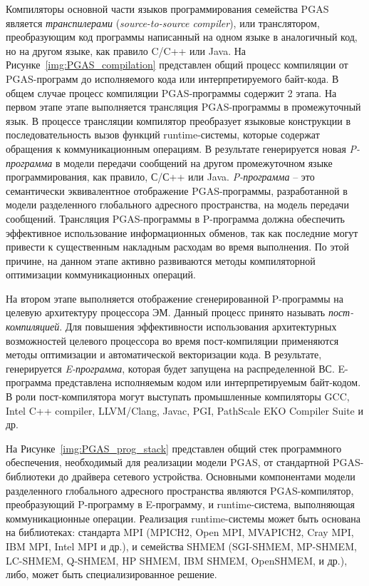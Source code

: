Компиляторы основной части языков программирования семейства PGAS является \textit{транспилерами} (\textit{source-to-source compiler}), или транслятором, преобразующим код программы написанный на одном языке в аналогичный код, но на другом языке, как правило C/C++ или Java. На Рисунке~\ref{img:PGAS_compilation} представлен общий процесс компиляции от PGAS-программ до исполняемого кода или интерпретируемого байт-кода. В общем случае процесс компиляции PGAS-программы содержит 2 этапа. На первом этапе этапе выполняется трансляция PGAS-программы в промежуточный язык. В процессе трансляции компилятор преобразует языковые конструкции в последовательность вызов функций runtime-системы, которые содержат обращения к коммуникационным операциям. В результате генерируется новая \textit{P-программа} в модели передачи сообщений на другом промежуточном языке программирования, как правило, С/С++ или Java. \textit{P-программа} -- это семантически эквивалентное отображение PGAS-программы, разработанной в модели разделенного глобального адресного пространства, на модель передачи сообщений. Трансляция PGAS-программы в P-программа должна обеспечить эффективное использование информационных обменов, так как последние могут привести  к существенным накладным расходам во время выполнения. По этой причине, на данном этапе активно развиваются методы компиляторной оптимизации коммуникационных операций.

На втором этапе выполняется отображение сгенерированной P-программы на целевую архитектуру процессора ЭМ. Данный процесс принято называть \textit{пост-компиляцией}. Для повышения эффективности использования архитектурных возможностей целевого процессора во время пост-компиляции применяются методы оптимизации и автоматической векторизации кода. В результате, генерируется \textit{E-программа}, которая будет запущена на распределенной ВС. E-программа представлена исполняемым кодом или интерпретируемым байт-кодом. В роли пост-компилятора могут выступать промышленные компиляторы GCC, Intel C++ compiler, LLVM/Clang, Javac, PGI, PathScale EKO Compiler Suite и др.

На Рисунке~\ref{img:PGAS_prog_stack} представлен общий стек программного обеспечения, необходимый для реализации модели PGAS, от стандартной PGAS-библиотеки до драйвера сетевого устройства. Основными компонентами модели разделенного глобального адресного пространства являются PGAS-компилятор, преобразующий P-программу в E-программу, и runtime-система, выполняющая коммуникационные операции. Реализация runtime-системы может быть основана на библиотеках: стандарта MPI (MPICH2, Open MPI, MVAPICH2, Cray MPI, IBM MPI, Intel MPI и др.), и семейства SHMEM (SGI-SHMEM, MP-SHMEM, LC-SHMEM, Q-SHMEM, HP SHMEM, IBM SHMEM, OpenSHMEM, и др.), либо, может быть специализированное решение.

